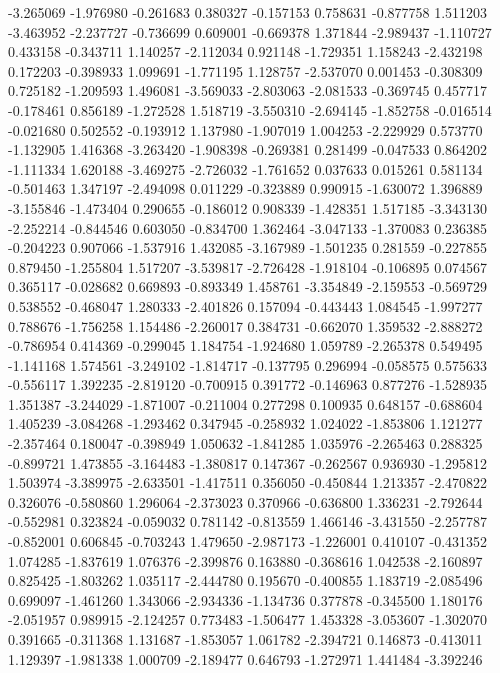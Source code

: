 -3.265069
-1.976980
-0.261683
0.380327
-0.157153
0.758631
-0.877758
1.511203
-3.463952
-2.237727
-0.736699
0.609001
-0.669378
1.371844
-2.989437
-1.110727
0.433158
-0.343711
1.140257
-2.112034
0.921148
-1.729351
1.158243
-2.432198
0.172203
-0.398933
1.099691
-1.771195
1.128757
-2.537070
0.001453
-0.308309
0.725182
-1.209593
1.496081
-3.569033
-2.803063
-2.081533
-0.369745
0.457717
-0.178461
0.856189
-1.272528
1.518719
-3.550310
-2.694145
-1.852758
-0.016514
-0.021680
0.502552
-0.193912
1.137980
-1.907019
1.004253
-2.229929
0.573770
-1.132905
1.416368
-3.263420
-1.908398
-0.269381
0.281499
-0.047533
0.864202
-1.111334
1.620188
-3.469275
-2.726032
-1.761652
0.037633
0.015261
0.581134
-0.501463
1.347197
-2.494098
0.011229
-0.323889
0.990915
-1.630072
1.396889
-3.155846
-1.473404
0.290655
-0.186012
0.908339
-1.428351
1.517185
-3.343130
-2.252214
-0.844546
0.603050
-0.834700
1.362464
-3.047133
-1.370083
0.236385
-0.204223
0.907066
-1.537916
1.432085
-3.167989
-1.501235
0.281559
-0.227855
0.879450
-1.255804
1.517207
-3.539817
-2.726428
-1.918104
-0.106895
0.074567
0.365117
-0.028682
0.669893
-0.893349
1.458761
-3.354849
-2.159553
-0.569729
0.538552
-0.468047
1.280333
-2.401826
0.157094
-0.443443
1.084545
-1.997277
0.788676
-1.756258
1.154486
-2.260017
0.384731
-0.662070
1.359532
-2.888272
-0.786954
0.414369
-0.299045
1.184754
-1.924680
1.059789
-2.265378
0.549495
-1.141168
1.574561
-3.249102
-1.814717
-0.137795
0.296994
-0.058575
0.575633
-0.556117
1.392235
-2.819120
-0.700915
0.391772
-0.146963
0.877276
-1.528935
1.351387
-3.244029
-1.871007
-0.211004
0.277298
0.100935
0.648157
-0.688604
1.405239
-3.084268
-1.293462
0.347945
-0.258932
1.024022
-1.853806
1.121277
-2.357464
0.180047
-0.398949
1.050632
-1.841285
1.035976
-2.265463
0.288325
-0.899721
1.473855
-3.164483
-1.380817
0.147367
-0.262567
0.936930
-1.295812
1.503974
-3.389975
-2.633501
-1.417511
0.356050
-0.450844
1.213357
-2.470822
0.326076
-0.580860
1.296064
-2.373023
0.370966
-0.636800
1.336231
-2.792644
-0.552981
0.323824
-0.059032
0.781142
-0.813559
1.466146
-3.431550
-2.257787
-0.852001
0.606845
-0.703243
1.479650
-2.987173
-1.226001
0.410107
-0.431352
1.074285
-1.837619
1.076376
-2.399876
0.163880
-0.368616
1.042538
-2.160897
0.825425
-1.803262
1.035117
-2.444780
0.195670
-0.400855
1.183719
-2.085496
0.699097
-1.461260
1.343066
-2.934336
-1.134736
0.377878
-0.345500
1.180176
-2.051957
0.989915
-2.124257
0.773483
-1.506477
1.453328
-3.053607
-1.302070
0.391665
-0.311368
1.131687
-1.853057
1.061782
-2.394721
0.146873
-0.413011
1.129397
-1.981338
1.000709
-2.189477
0.646793
-1.272971
1.441484
-3.392246
